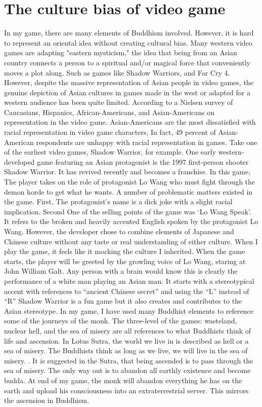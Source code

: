 \documentclass[10pt,twocolumn]{article}
\begin{document}
\section{The culture bias of video game  }
In my game, there are many elements of Buddhism involved. However, it is hard to represent an oriental idea without creating cultural bias. Many western video games are adapting "eastern mysticism," the idea that being from an Asian country connects a person to a spiritual and/or magical force that conveniently moves a plot along. Such as games like Shadow Warriors, and Far Cry 4.  However, despite the massive representation of Asian people in video games, the genuine depiction of Asian cultures in games made in the west or adapted for a western audience has been quite limited. 
According to a Nielsen survey of Caucasians, Hispanics, African-Americans, and Asian-Americans on representation in the video game. Asian-Americans are the most dissatisfied with racial representation in video game characters, In fact, 49 percent of Asian-American respondents are unhappy with racial representation in games. Take one of the earliest video games, Shadow Warrior, for example. 
One early western-developed game featuring an Asian protagonist is the 1997 first-person shooter Shadow Warrior. It has revived recently and becomes a franchise. In this game, The player takes on the role of protagonist Lo Wang who must fight through the demon horde to get what he wants. 
A number of problematic matters existed in the game. First, The protagonist’s name is a dick joke with a slight racial implication. Second One of the selling points of the game was  ‘Lo Wang Speak’. It refers to the broken and heavily accented English spoken by the protagonist Lo Wang.  However, the developer chose to combine elements of Japanese and Chinese culture without any taste or real understanding of either culture. When I play the game, it feels like it mocking the culture I inherited. When the game starts, the player will be greeted by the growling voice of Lo Wang, staring at John William Galt. Any person with a brain would know this is clearly the performance of a white man playing an Asian man. It starts with a stereotypical accent with references to “ancient Chinese secret” and using the “L” instead of “R” Shadow Warrior is a fun game but it also creates and contributes to the Asian stereotype. 
In my game, I have used many Buddhist elements to reference some of the journeys of the monk. The three-level of the games: wasteland, nuclear hell, and the sea of misery are all 
 references to what Buddhists think of life and ascension. In Lotus Sutra, the world we live in is described as hell or a sea of misery. The Buddhists think as long as we live, we will live in the sea of misery. . It is suggested in the Sutra, that being ascended is to pass through the sea of misery. The only way out is to abandon all earthly existence and become budda. At end of my game, the monk will abandon everything he has on the earth and upload his consciousness into an extraterrestrial server. This mirrors the ascension in Buddhism.
\end{document}
